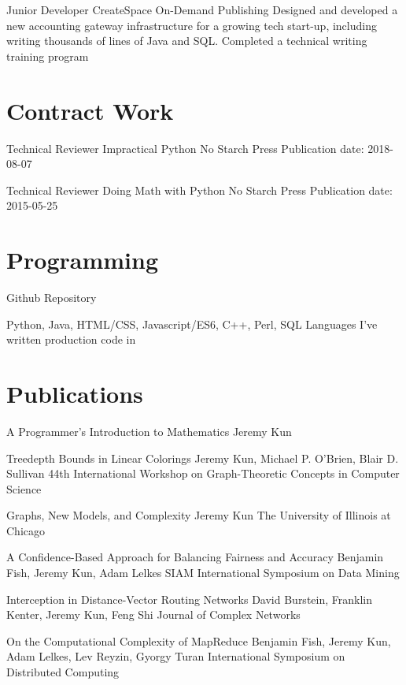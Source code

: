 \documentclass[11pt]{moderncv}
\begin{document}
  {Junior Developer}
  {CreateSpace On-Demand Publishing}
  {}
  {}
  {Designed and developed a new accounting gateway infrastructure for a growing tech start-up, including writing thousands of lines of Java and SQL. Completed a technical writing training program}

\section{Contract Work}

  {Technical Reviewer}
  {Impractical Python}
  {No Starch Press}
  {}
  {Publication date: 2018-08-07}

  {Technical Reviewer}
  {Doing Math with Python}
  {No Starch Press}
  {}
  {Publication date: 2015-05-25}

\section{Programming}

  {Github Repository}
  {}
  {}
  {}
  {}

  {Python, Java, HTML/CSS, Javascript/ES6, C++, Perl, SQL}
  {}
  {Languages I've written production code in}
  {}
  {}

\section{Publications}

  {A Programmer's Introduction to Mathematics}
  {Jeremy Kun}
  {}
  {}
  {}

  {Treedepth Bounds in Linear Colorings}
  {Jeremy Kun, Michael P. O'Brien, Blair D. Sullivan}
  {44th International Workshop on Graph-Theoretic Concepts in Computer Science}
  {}
  {}

  {Graphs, New Models, and Complexity}
  {Jeremy Kun}
  {The University of Illinois at Chicago}
  {}
  {}

  {A Confidence-Based Approach for Balancing Fairness and Accuracy}
  {Benjamin Fish, Jeremy Kun, Adam Lelkes}
  {SIAM International Symposium on Data Mining}
  {}
  {}

  {Interception in Distance-Vector Routing Networks}
  {David Burstein, Franklin Kenter, Jeremy Kun, Feng Shi}
  {Journal of Complex Networks}
  {}
  {}

  {On the Computational Complexity of MapReduce}
  {Benjamin Fish, Jeremy Kun, Adam Lelkes, Lev Reyzin, Gyorgy Turan}
  {International Symposium on Distributed Computing}
  {}
  {}
\end{document}
